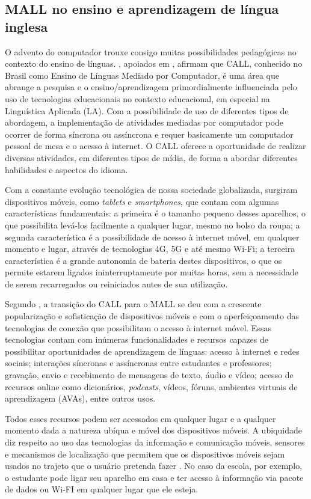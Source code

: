 \documentclass[portuguese]{textolivre}
\begin{document}
\subsection{MALL no ensino e aprendizagem de língua inglesa}
O advento do computador trouxe consigo muitas possibilidades pedagógicas no contexto do ensino de línguas. \textcite{bragaand2017call}, apoiados em \textcite{chapelle_call_1997}, afirmam que CALL, conhecido no Brasil como Ensino de Línguas Mediado por Computador, é uma área que abrange a pesquisa e o ensino/aprendizagem primordialmente influenciada pelo uso de tecnologias educacionais no contexto educacional, em especial na Linguística Aplicada (LA). Com a possibilidade de uso de diferentes tipos de abordagem, a implementação de atividades mediadas por computador pode ocorrer de forma síncrona ou assíncrona e requer basicamente um computador pessoal de mesa e o acesso à internet. O CALL oferece a oportunidade de realizar diversas atividades, em diferentes tipos de mídia, de forma a abordar diferentes habilidades e aspectos do idioma.

Com a constante evolução tecnológica de nossa sociedade globalizada, surgiram dispositivos móveis, como \emph{tablets} e \emph{smartphones}, que contam com algumas características fundamentais: a primeira é o tamanho pequeno desses aparelhos, o que possibilita levá-los facilmente a qualquer lugar, mesmo no bolso da roupa; a segunda característica é a possibilidade de acesso à internet móvel, em qualquer momento e lugar, através de tecnologias 4G, 5G e até mesmo Wi-Fi; a terceira característica é a grande autonomia de bateria destes dispositivos, o que os permite estarem ligados ininterruptamente por muitas horas, sem a necessidade de serem recarregados ou reiniciados antes de sua utilização.

Segundo \textcite{bragaand2017call}, a transição do CALL para o MALL se deu com a crescente popularização e sofisticação de dispositivos móveis e com o aperfeiçoamento das tecnologias de conexão que possibilitam o acesso à internet móvel. Essas tecnologias contam com inúmeras funcionalidades e recursos capazes de possibilitar oportunidades de aprendizagem de línguas: acesso à internet e redes sociais; interações síncronas e assíncronas entre estudantes e professores; gravação, envio e recebimento de mensagens de texto, áudio e vídeo; acesso de recursos online como dicionários, \emph{podcasts}, vídeos, fóruns, ambientes virtuais de aprendizagem (AVAs), entre outros usos. 

Todos esses recursos podem ser acessados em qualquer lugar e a qualquer momento dada a natureza ubíqua e móvel dos dispositivos móveis. A ubiquidade diz respeito ao uso das tecnologias da informação e comunicação móveis, sensores e mecanismos de localização que permitem que os dispositivos móveis sejam usados no trajeto que o usuário pretenda fazer \cite{saccol2011m}. No caso da escola, por exemplo, o estudante pode ligar seu aparelho em casa e ter acesso à informação via pacote de dados ou Wi-FI em qualquer lugar que ele esteja.
\end{document}
